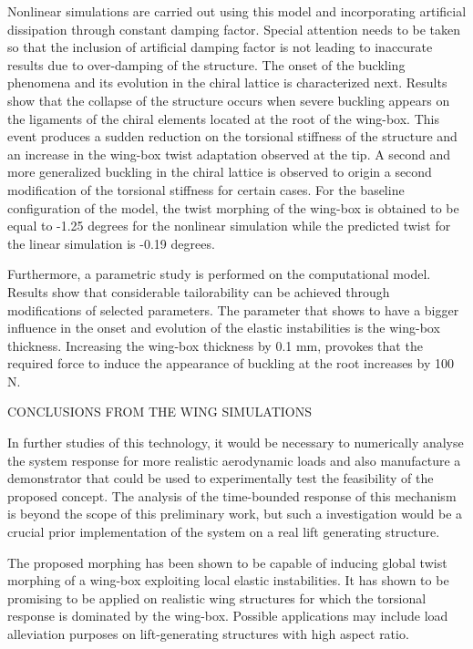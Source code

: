 Nonlinear simulations are carried out using this model and incorporating artificial dissipation through constant damping factor. Special attention needs to be taken so that the inclusion of artificial damping factor is not leading to inaccurate results due to over-damping of the structure. The onset of the buckling phenomena and its evolution in the chiral lattice is characterized next. Results show that the collapse of the structure occurs when severe buckling appears on the ligaments of the chiral elements located at the root of the wing-box. This event produces a sudden reduction on the torsional stiffness of the structure and an increase in the wing-box twist adaptation observed at the tip. A second and more generalized buckling in the chiral lattice is observed to origin a second modification of the torsional stiffness for certain cases. For the baseline configuration of the model, the twist morphing of the wing-box is obtained to be equal to -1.25 degrees for the nonlinear simulation while the predicted twist for the linear simulation is -0.19 degrees.

Furthermore, a parametric study is performed on the computational model. Results show that considerable tailorability can be achieved through modifications of selected parameters. The parameter that shows to have a bigger influence in the onset and evolution of the elastic instabilities is the wing-box thickness. Increasing the wing-box thickness by 0.1 mm, provokes that the required force to induce the appearance of buckling at the root increases by 100 N. 

CONCLUSIONS FROM THE WING SIMULATIONS

In further studies of this technology, it would be necessary to numerically analyse the system response for more realistic aerodynamic loads and also manufacture a demonstrator that could be used to experimentally test the feasibility of the proposed concept. The analysis of the time-bounded response of this mechanism is beyond the scope of this preliminary work, but such a investigation would be a crucial prior implementation of the system on a real lift generating structure.

The proposed morphing has been shown to be capable of inducing global twist morphing of a wing-box exploiting local elastic instabilities. It has shown to be promising to be applied on realistic wing structures for which the torsional response is dominated by the wing-box. Possible applications may include load alleviation purposes on lift-generating structures with high aspect ratio. 